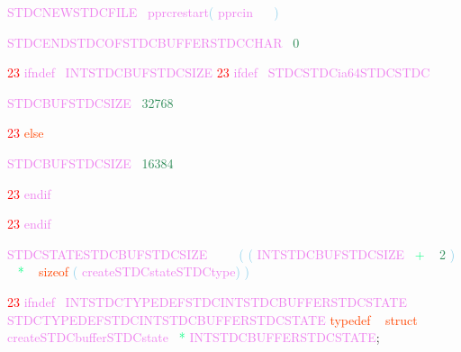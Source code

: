 \documentclass[8, usernames, dvipsnames]{beamer}
\begin{document}
\begin{frame}
\textcolor{Violet}{STDCNEWSTDCFILE}\textcolor{White}{\ }
\textcolor{Violet}{pprcrestart}\textcolor{SkyBlue}{(}
\textcolor{Violet}{pprcin}\textcolor{White}{\ }
\textcolor{White}{\ }
\textcolor{SkyBlue}{)}

 
 \textcolor{Violet}{STDCENDSTDCOFSTDCBUFFERSTDCCHAR}\textcolor{White}{\ }
\textcolor{SeaGreen}{0}

 
 
  \textcolor{Red}{23}
\textcolor{Violet}{ifndef}\textcolor{White}{\ }
\textcolor{Violet}{INTSTDCBUFSTDCSIZE}
  \textcolor{Red}{23}
\textcolor{Violet}{ifdef}\textcolor{White}{\ }
\textcolor{Violet}{STDCSTDCia64STDCSTDC}
 
 \textcolor{Violet}{STDCBUFSTDCSIZE}\textcolor{White}{\ }
\textcolor{SeaGreen}{32768}

  \textcolor{Red}{23}
\textcolor{OrangeRed}{else}

 \end{frame}
\begin{frame}
\textcolor{Violet}{STDCBUFSTDCSIZE}\textcolor{White}{\ }
\textcolor{SeaGreen}{16384}

  \textcolor{Red}{23}
\textcolor{Violet}{endif}\textcolor{White}{\ }

  \textcolor{Red}{23}
\textcolor{Violet}{endif}
 
 
 \textcolor{Violet}{STDCSTATESTDCBUFSTDCSIZE}\textcolor{White}{\ }
\textcolor{White}{\ }
\textcolor{White}{\ }
\textcolor{SkyBlue}{(}
\textcolor{SkyBlue}{(}
\textcolor{Violet}{INTSTDCBUFSTDCSIZE}\textcolor{White}{\ }
\textcolor{SpringGreen}{+}
\textcolor{White}{\ }
\textcolor{SeaGreen}{2}
\textcolor{SkyBlue}{)}
\textcolor{White}{\ }
\textcolor{SpringGreen}{*}
\textcolor{White}{\ }
\textcolor{OrangeRed}{sizeof}
\textcolor{SkyBlue}{(}
\textcolor{Violet}{createSTDCstateSTDCtype}\textcolor{SkyBlue}{)}
\textcolor{SkyBlue}{)}

 
  \textcolor{Red}{23}
\textcolor{Violet}{ifndef}\textcolor{White}{\ }
\textcolor{Violet}{INTSTDCTYPEDEFSTDCINTSTDCBUFFERSTDCSTATE}
 \textcolor{Violet}{STDCTYPEDEFSTDCINTSTDCBUFFERSTDCSTATE}
 \textcolor{OrangeRed}{typedef}
\textcolor{White}{\ }
\textcolor{OrangeRed}{struct}
\textcolor{White}{\ }
\textcolor{Violet}{createSTDCbufferSTDCstate}\textcolor{White}{\ }
\textcolor{SpringGreen}{*}
\textcolor{Violet}{INTSTDCBUFFERSTDCSTATE}\textcolor{Sepia}{;}

 \end{frame}
\end{document}
